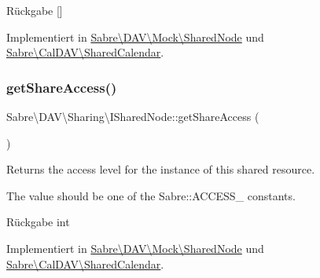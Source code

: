 \begin{DoxyReturn}{Rückgabe}
\mbox{[}\mbox{]} 
\end{DoxyReturn}


Implementiert in \mbox{\hyperlink{class_sabre_1_1_d_a_v_1_1_mock_1_1_shared_node_a6deaecb18be485adbdc98b0132b4ab1e}{Sabre\textbackslash{}\+D\+A\+V\textbackslash{}\+Mock\textbackslash{}\+Shared\+Node}} und \mbox{\hyperlink{class_sabre_1_1_cal_d_a_v_1_1_shared_calendar_afb00675ab09e20eb1b1542c7b482119d}{Sabre\textbackslash{}\+Cal\+D\+A\+V\textbackslash{}\+Shared\+Calendar}}.

\mbox{\label{interface_sabre_1_1_d_a_v_1_1_sharing_1_1_i_shared_node_a1c9b44f6acd1cd63b211bdf987b9d098}} 
\subsubsection{\texorpdfstring{get\+Share\+Access()}{getShareAccess()}}
{\footnotesize\ttfamily Sabre\textbackslash{}\+D\+A\+V\textbackslash{}\+Sharing\textbackslash{}\+I\+Shared\+Node\+::get\+Share\+Access (\begin{DoxyParamCaption}{ }\end{DoxyParamCaption})}

Returns the \textquotesingle{}access level\textquotesingle{} for the instance of this shared resource.

The value should be one of the Sabre\+::\+A\+C\+C\+E\+S\+S\+\_\+ constants.

\begin{DoxyReturn}{Rückgabe}
int 
\end{DoxyReturn}


Implementiert in \mbox{\hyperlink{class_sabre_1_1_d_a_v_1_1_mock_1_1_shared_node_a1b17b0c416f56f137a232a60ed8db525}{Sabre\textbackslash{}\+D\+A\+V\textbackslash{}\+Mock\textbackslash{}\+Shared\+Node}} und \mbox{\hyperlink{class_sabre_1_1_cal_d_a_v_1_1_shared_calendar_a6a543caf4cf5c259d9a8de538fbd5e11}{Sabre\textbackslash{}\+Cal\+D\+A\+V\textbackslash{}\+Shared\+Calendar}}.

\mbox{\label{interface_sabre_1_1_d_a_v_1_1_sharing_1_1_i_shared_node_a54b1073bfc389995c722566e18426902}} 
